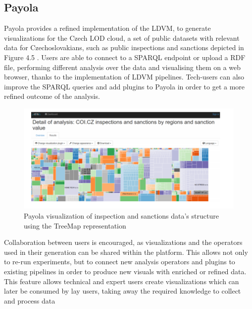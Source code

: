 \documentclass[a4paper,12pt,oneside]{report}
\begin{document}
{{{{\subsection{Payola}
{Payola  provides a refined implementation of the LDVM, to generate visualizations for the Czech LOD cloud, a set of public datasets with relevant data for Czechoslovakians, such as public inspections and sanctions depicted in Figure 4.5 . Users are able to connect to a SPARQL endpoint or upload a RDF file, performing different analysis over the data and visualising them on a web browser, thanks to the implementation of LDVM pipelines. Tech-users can also improve the SPARQL queries and add plugins to Payola in order to
get a more refined outcome of the analysis.
\begin{figure}[h!]
\centering
\includegraphics[width=1\textwidth]{Capture13}
\caption{Payola visualization of inspection and sanctions data’s structure using the TreeMap representation}
\end{figure}
Collaboration between users is encouraged, as visualizations and the operators used in their generation can be shared within the platform. This allows not only to re-run experiments, but to connect new analysis operators and plugins to existing pipelines in order to produce new visuals with enriched or refined data. This feature allows technical and expert users create visualizations which can later be consumed by lay users, taking away the required knowledge to collect and process data}
}}}}
\end{document}
